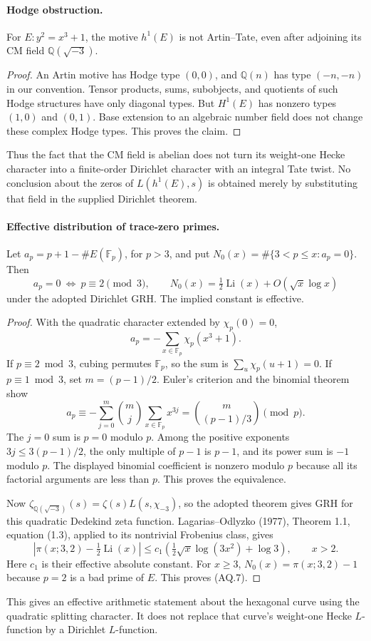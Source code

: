 \documentclass[11pt,a4paper]{article}
\theoremstyle{definition}\newtheorem{definition}[theorem]{Definition}
\theoremstyle{remark}\newtheorem{remark}[theorem]{Remark}
\begin{document}
\paragraph{Hodge obstruction.}
For $E:y^2=x^3+1$, the motive $h^1(E)$ is not Artin--Tate,
even after adjoining its CM field $\mathbb Q(\sqrt{-3})$.
\begin{proof}
An Artin motive has Hodge type $(0,0)$, and $\mathbb Q(n)$
has type $(-n,-n)$ in our convention.
Tensor products, sums, subobjects, and quotients of such
Hodge structures have only diagonal types. But
$H^1(E)$ has nonzero types $(1,0)$ and $(0,1)$.
Base extension to an algebraic number field does not
change these complex Hodge types. This proves the claim.
\end{proof}
Thus the fact that the CM field is abelian does not turn
its weight-one Hecke character into a finite-order
Dirichlet character with an integral Tate twist.
No conclusion about the zeros of $L(h^1(E),s)$ is obtained
merely by substituting that field in the supplied
Dirichlet theorem.

\paragraph{Effective distribution of trace-zero primes.}
Let $a_p=p+1-\#E(\mathbb F_p)$, for $p>3$, and put
$N_0(x)=\#\{3<p\leq x:a_p=0\}$. Then
\[
 a_p=0\ \Longleftrightarrow\ p\equiv2\pmod3,\qquad
 N_0(x)=\tfrac12\operatorname{Li}(x)+O(\sqrt x\log x)            \tag{AQ.7}
\]
under the adopted Dirichlet GRH. The implied constant is
effective.
\begin{proof}
With the quadratic character extended by $\chi_p(0)=0$,
\[
 a_p=-\sum_{x\in\mathbb F_p}\chi_p(x^3+1).
\]
If $p\equiv2\bmod3$, cubing permutes $\mathbb F_p$,
so the sum is $\sum_u\chi_p(u+1)=0$.
If $p\equiv1\bmod3$, set $m=(p-1)/2$.
Euler's criterion and the binomial theorem show
\[
 a_p\equiv-\sum_{j=0}^m {m\choose j}
                 \sum_{x\in\mathbb F_p}x^{3j}
       ={m\choose (p-1)/3}\pmod p.
\]
The $j=0$ sum is $p=0$ modulo $p$.
Among the positive exponents $3j\leq3(p-1)/2$, the
only multiple of $p-1$ is $p-1$, and its power sum is
$-1$ modulo $p$. The displayed binomial coefficient
is nonzero modulo $p$ because all its factorial arguments
are less than $p$. This proves the equivalence.

Now $\zeta_{\mathbb Q(\sqrt{-3})}(s)=
\zeta(s)L(s,\chi_{-3})$, so the adopted theorem gives
GRH for this quadratic Dedekind zeta function.
Lagarias--Odlyzko (1977), Theorem 1.1, equation (1.3),
applied to its nontrivial Frobenius class, gives
\[
 \left|\pi(x;3,2)-\tfrac12\operatorname{Li}(x)\right|
 \leq c_1\left(\tfrac12\sqrt x\log(3x^2)+\log3\right),
 \qquad x>2.
\]
Here $c_1$ is their effective absolute constant.
For $x\geq3$, $N_0(x)=\pi(x;3,2)-1$ because $p=2$
is a bad prime of $E$. This proves (AQ.7).
\end{proof}
This gives an effective arithmetic statement about the
hexagonal curve using the quadratic splitting character.
It does not replace that curve's weight-one Hecke
$L$-function by a Dirichlet $L$-function.
\end{document}
